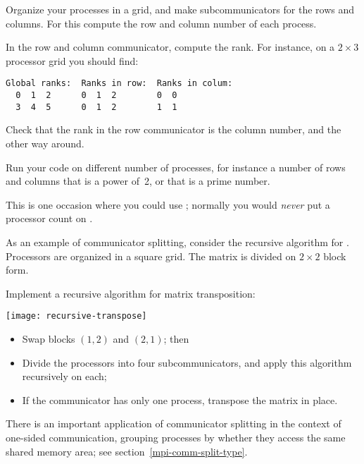 \begin{exercise}
  \label{ex:rowcolcomm}
  Organize your processes in a grid, and make subcommunicators for
  the rows and columns. For this compute the row and column number of
  each process.

  In the row and column communicator, compute the rank. For instance,
  on a $2\times3$ processor grid you should find:
\begin{verbatim}
Global ranks:  Ranks in row:  Ranks in colum:
  0  1  2      0  1  2        0  0
  3  4  5      0  1  2        1  1
\end{verbatim}

  Check that the rank in the row communicator is the column number,
  and the other way around.

  Run your code on different number of processes, for instance a
  number of rows and columns that is a power of~2, or that is a prime number.
\begin{tacc}
    This is one occasion where you could use ;
    normally you would \emph{never} put a processor count on .
\end{tacc}
\end{exercise}

As an example of communicator splitting, consider the recursive
algorithm for .
Processors are organized in a square grid. The matrix is divided
on $2\times 2$ block form.

\begin{exercise}
  \label{ex:recursivetranspose}
  Implement a recursive algorithm for matrix transposition:
  
  \texttt{[image: recursive-transpose]}

  \begin{itemize}
  \item Swap blocks $(1,2)$ and $(2,1)$; then
  \item Divide the processors into four subcommunicators, and
    apply this algorithm recursively on each;
  \item If the communicator has only one process, transpose the matrix in place.
  \end{itemize}
\end{exercise}

There is an important application of communicator splitting in the
context of one-sided communication, grouping processes by whether they
access the same shared memory area; see section~\ref{mpi-comm-split-type}.

